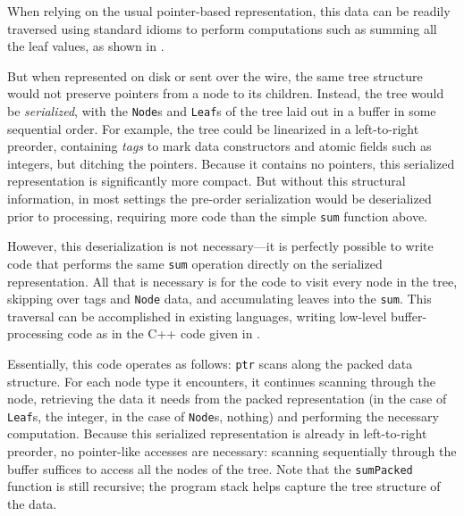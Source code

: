 \documentclass[showabstract,showacknowledgments,showpreface,showdedication]{iuphd}
\theoremstyle{nonumberplain}
\newcommand{\il}[1]{\lstinline[style=inline,mathescape=true];#1;}
\begin{document}
When relying on the usual pointer-based representation, this data 
can be readily traversed using standard idioms to perform computations such as summing all the leaf values, as shown in .



But when represented on disk or sent over the wire, the same tree structure
would not preserve pointers from a node to its children. Instead, the tree
would be {\em serialized}, with the \il{Node}s and \il{Leaf}s of the tree laid
out in a buffer in some sequential order. For example, the tree could be
linearized in a left-to-right preorder, containing {\em tags} to mark data
constructors and atomic fields such as integers, but ditching the pointers.
Because it contains no pointers, this serialized representation is
significantly more compact.
%
But without this structural information, in most settings the
pre-order serialization would be deserialized prior to processing,
requiring more code than the simple \il{sum} function above.

However, this deserialization
is not necessary---it is perfectly possible to write code that performs
the same \il{sum} operation directly on the serialized representation.
All that is necessary is for the code to visit every node in the tree, skipping over
tags and \il{Node} data, and accumulating leaves into the \il{sum}.
%
This traversal can be accomplished in existing languages, writing low-level
buffer-processing code as in the C++ code given in .

Essentially, this code operates as follows: \il{ptr} scans along the packed
data structure. For each node type it encounters, it continues scanning
through the node, retrieving the data it needs from the packed representation
(in the case of \il{Leaf}s, the integer, in the case of \il{Node}s,
nothing) and performing the necessary computation. Because this serialized
representation is already in left-to-right preorder, no pointer-like
accesses are necessary: scanning sequentially through the buffer suffices to
access all the nodes of the tree. Note that the \il{sumPacked} function is
still recursive; the program stack helps capture the tree structure of the
data.
\end{document}
